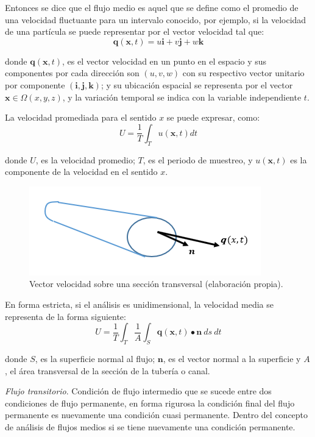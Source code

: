 \documentclass[letterpaper]{report}
\begin{document}
Entonces se dice que el flujo medio es aquel que se define como el promedio de una velocidad fluctuante para 
un intervalo conocido, por ejemplo, si la velocidad de una partícula se puede representar por el vector velocidad tal que:
\begin{equation}
\mathbf{q}(\mathbf{x},t)=u\mathbf{i}+v\mathbf{j}+w\mathbf{k}
\end{equation}

donde $\mathbf{q}(\mathbf{x},t)$, es el vector velocidad en un punto en el espacio y sus componentes por cada dirección son
 $(u,v,w)$ con su respectivo vector unitario por componente $(\mathbf{i}, \mathbf{j}, \mathbf{k})$; y su ubicación espacial
 se representa por el vector $\mathbf{x} \in \Omega(x, y, z)$, y la variación temporal se indica con la variable independiente $t$.\bigskip

La velocidad promediada para el sentido $x$ se puede expresar, como: 
\begin{equation}
	U = \frac{1}{T}\int_T {u(\mathbf{x}, t)dt}
\end{equation}

donde $U$, es la velocidad promedio; $T$, es el periodo de muestreo, y $u(\mathbf{x}, t)$ es la componente de la velocidad en el sentido $x$.\bigskip

\begin{figure}[H]
	\centering
	\includegraphics[width=.5\linewidth]{fig12}
	\caption{Vector velocidad sobre una sección transversal (elaboración propia).}
	\label{fig:fig12}
\end{figure}

En forma estricta, si el análisis es unidimensional, la velocidad media se representa de la forma siguiente:
\begin{equation}
	U = \frac{1}{T}\int_T \frac{1}{A}\int_S{\mathbf{q}(\mathbf{x}, t)} \bullet \mathbf{n} \ ds \ dt
\end{equation}

donde $S$, es la superficie normal al flujo; $\mathbf{n}$, es el vector normal a la superficie y $A$, el área transversal de la sección 
de la tubería o canal.\bigskip

\emph{Flujo transitorio}. Condición de flujo intermedio que se sucede entre dos condiciones de flujo permanente, en forma 
rigurosa la condición final del flujo permanente es nuevamente una condición cuasi permanente. Dentro del concepto de análisis 
de flujos medios si se tiene nuevamente una condición permanente.\bigskip
\end{document}
